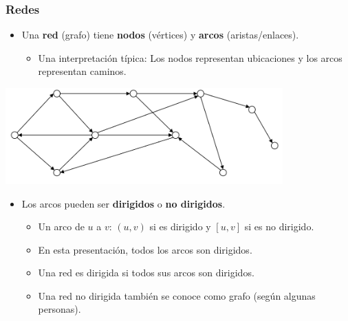 \documentclass{beamer}
\begin{document}
\begin{frame}
    \frametitle{Redes}
    
    \begin{itemize}
        \item Una \textbf{red} (grafo) tiene \textbf{nodos} (vértices) y \textbf{arcos} (aristas/enlaces).
        \begin{itemize}
            \item Una interpretación típica: Los nodos representan ubicaciones y los arcos representan caminos.
        \end{itemize}
    \end{itemize}
    
    \begin{center}
        \includegraphics[width=0.8\textwidth]{images/network_graph.png} %
    \end{center}
    
    \begin{itemize}
        \item Los arcos pueden ser \textbf{dirigidos} o \textbf{no dirigidos}.
        \begin{itemize}
            \item Un arco de $u$ a $v$: $(u,v)$ si es dirigido y $[u,v]$ si es no dirigido.
            \item En esta presentación, todos los arcos son dirigidos.
            \item Una red es dirigida si todos sus arcos son dirigidos.
            \item Una red no dirigida también se conoce como grafo (según algunas personas).
        \end{itemize}
    \end{itemize}

\end{frame}
\end{document}
